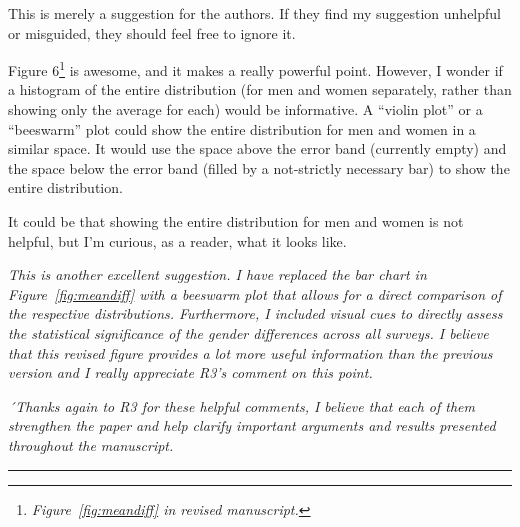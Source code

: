 This is merely a suggestion for the authors. If they find my suggestion unhelpful or misguided, they should feel free to ignore it.

Figure 6\footnote{\textit{Figure~\ref{fig:meandiff} in revised manuscript.}} is awesome, and it makes a really powerful point. However, I wonder if a histogram of the entire distribution (for men and women separately, rather than showing only the average for each) would be informative. A ``violin plot'' or a ``beeswarm'' plot could show the entire distribution for men and women in a similar space. It would use the space above the error band (currently empty) and the space below the error band (filled by a not-strictly necessary bar) to show the entire distribution.

It could be that showing the entire distribution for men and women is not helpful, but I’m curious, as a reader, what it looks like.

\textit{This is another excellent suggestion. I have replaced the bar chart in Figure~\ref{fig:meandiff} with a beeswarm plot that allows for a direct comparison of the respective distributions. Furthermore, I included visual cues to directly assess the statistical significance of the gender differences across all surveys. I believe that this revised figure provides a lot more useful information than the previous version and I really appreciate R3's comment on this point.}

\textit{´Thanks again to R3 for these helpful comments, I believe that each of them strengthen the paper and help clarify important arguments and results presented throughout the manuscript.}


\rule{\linewidth}{.01cm}